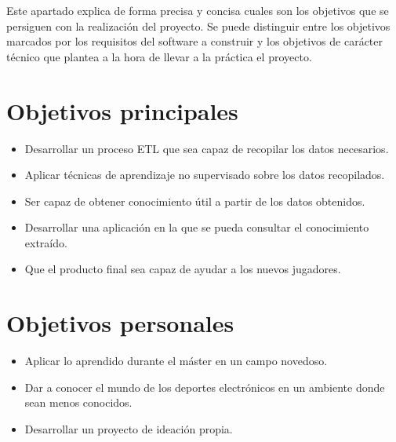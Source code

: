 
Este apartado explica de forma precisa y concisa cuales son los objetivos que se persiguen con la realización del proyecto. Se puede distinguir entre los objetivos marcados por los requisitos del software a construir y los objetivos de carácter técnico que plantea a la hora de llevar a la práctica el proyecto.

\section{Objetivos principales}
\begin{itemize}
    \item Desarrollar un proceso ETL que sea capaz de recopilar los datos necesarios.
    \item Aplicar técnicas de aprendizaje no supervisado sobre los datos recopilados.
    \item Ser capaz de obtener conocimiento útil a partir de los datos obtenidos.
    \item Desarrollar una aplicación en la que se pueda consultar el conocimiento extraído.
    \item Que el producto final sea capaz de ayudar a los nuevos jugadores.
\end{itemize}


\section{Objetivos personales}
\begin{itemize}
    \item Aplicar lo aprendido durante el máster en un campo novedoso.
    \item Dar a conocer el mundo de los deportes electrónicos en un ambiente donde sean menos conocidos.
    \item Desarrollar un proyecto de ideación propia.
\end{itemize}